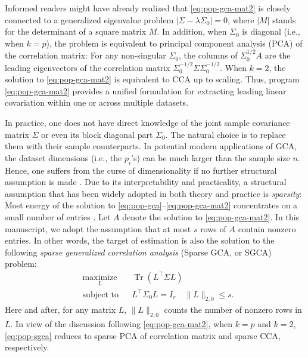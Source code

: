 \documentclass[11pt]{article}
\DeclareMathOperator{\Tr}{Tr}
\newcommand{\0}{{\mathbf{0}}}
\begin{document}
Informed readers might have already realized that \eqref{eq:pop-gca-mat2} is closely connected to a generalized eigenvalue problem 
$|\Sigma - \lambda \Sigma_0| = 0$,
where $|M|$ stands for the determinant of a square matrix $M$.
In addition, when $\Sigma_0$ is diagonal (i.e., when $k=p$), the problem is equivalent to principal component analysis (PCA) of the correlation matrix:
For any non-singular $\Sigma_0$, the columns of $\Sigma_0^{1/2}A$ are the leading eigenvectors of the correlation matrix $\Sigma_0^{-1/2}\Sigma \Sigma_0^{-1/2}$.
When $k = 2$, the solution to \eqref{eq:pop-gca-mat2} is equivalent to CCA up to scaling.
Thus, program \eqref{eq:pop-gca-mat2} provides a 
unified
formulation for extracting leading linear covariation within one or across multiple datasets.

 

In practice,
one does not have direct knowledge of the joint sample covariance matrix $\Sigma$ or even its block diagonal part $\Sigma_0$.
The natural choice is to replace them with their sample counterparts.
In potential modern applications of GCA, the dataset dimensions (i.e., the $p_i$'s) can be much larger than the sample size $n$. 
Hence, one suffers from the curse of dimensionality if no further structural assumption is made \citep{donoho2000high,johnstone2001distribution,bickel2008covariance,bickel2008regularized}.
Due to its interpretability and practicality, a structural assumption 
that has been widely adopted in both theory and practice
is \emph{sparsity}: Most energy of the solution to \eqref{eq:pop-gca}--\eqref{eq:pop-gca-mat2} concentrates on a small number of entries \citep{hastie2015statistical,wainwright2019high}.
Let $A$ denote the solution to \eqref{eq:pop-gca-mat2}.
In this manuscript, we adopt the assumption that at most $s$ rows of $A$  contain nonzero entries. 
In other words, the target of estimation is also the solution to the following \emph{sparse generalized correlation analysis} (Sparse GCA, or SGCA) problem:
\begin{equation} 
      \label{eq:pop-sgca}
\begin{aligned}
& \underset{L}{\text{maximize}}
& & \Tr(L^\top \Sigma L) \\
& \text{subject to}
& & L^\top \Sigma_0L=I_r\quad \|L\|_{2,0}\leq s.
\end{aligned}
\end{equation}
Here and after, for any matrix $L$, $\|L\|_{2,0}$ counts the number of nonzero rows in $L$.
In view of the discussion following \eqref{eq:pop-gca-mat2}, when $k=p$ and $k=2$, \eqref{eq:pop-sgca} reduces to sparse PCA of correlation matrix and sparse CCA, respectively.
\end{document}
